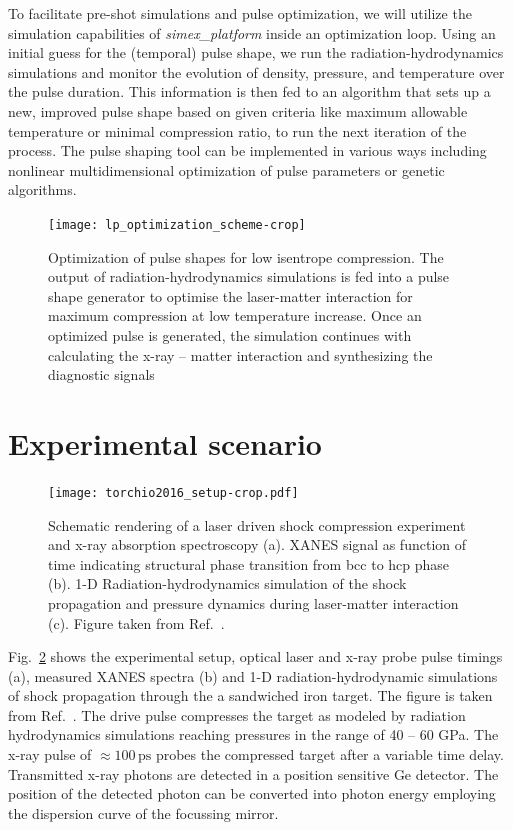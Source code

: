 \documentclass[12pt]{scrartcl}
\begin{document}
To facilitate pre-shot simulations and pulse optimization, we will utilize the
simulation capabilities of \textit{simex\_platform} inside an optimization loop.
Using an initial guess for the (temporal) pulse shape, we run the
radiation-hydrodynamics simulations and monitor the evolution of density,
pressure, and temperature over the pulse duration. This information is then fed
to an algorithm that sets up a new, improved pulse shape based on given criteria
like maximum allowable temperature or minimal compression ratio, to run the next
iteration of the process.
The pulse shaping tool can be implemented in various
ways including nonlinear multidimensional optimization of pulse parameters or genetic algorithms.

\begin{figure}[ht]
  \begin{center}
    \texttt{[image: lp\_optimization\_scheme-crop]}
  \end{center}
  \caption{Optimization of pulse shapes for low isentrope compression. The
  output of radiation-hydrodynamics simulations is fed into a pulse shape
generator to optimise the laser-matter interaction for maximum compression at
low temperature increase. Once an optimized pulse is generated, the simulation
continues with calculating the x-ray -- matter interaction and synthesizing the
diagnostic signals}
  \label{fig:lp_optimization_schem}
\end{figure}


\section{Experimental scenario}
\begin{figure}[ht]
  \begin{center}
    \texttt{[image: torchio2016\_setup-crop.pdf]}
  \end{center}
  \caption{Schematic rendering of a laser driven shock compression experiment
  and x-ray absorption spectroscopy (a). XANES signal as function of time
indicating structural phase transition from bcc to hcp phase (b). 1-D
Radiation-hydrodynamics simulation of the shock
propagation and pressure dynamics during laser-matter interaction (c).
Figure taken from Ref.~\cite{Torchio2016}.}
  \label{fig:exp_setup}
\end{figure}
Fig.~\ref{fig:exp_setup} shows the experimental setup, optical laser and x-ray
probe pulse timings (a), measured XANES spectra (b) and 1-D radiation-hydrodynamic
simulations of shock propagation through the a sandwiched iron target.
The figure is taken from Ref.~\cite{Torchio2016}. The drive pulse compresses the
target as modeled by radiation hydrodynamics simulations reaching pressures in
the range of 40 -- 60 GPa. The x-ray pulse of $\approx 100\,\text{ps}$ probes
the compressed target after a variable time delay. Transmitted x-ray photons are
detected in a position sensitive Ge detector. The position of the detected
photon can be converted into photon energy employing the dispersion curve of the
focussing mirror.
\end{document}
